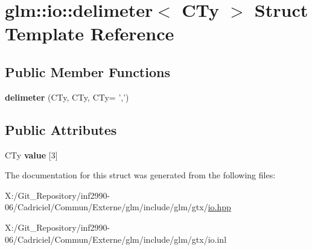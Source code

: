 \hypertarget{structglm_1_1io_1_1delimeter}{\section{glm\-:\-:io\-:\-:delimeter$<$ C\-Ty $>$ Struct Template Reference}
\label{structglm_1_1io_1_1delimeter}
}
\subsection*{Public Member Functions}
\begin{DoxyCompactItemize}
\item 
\hypertarget{structglm_1_1io_1_1delimeter_acd4b6e1e816d423a069688c4772b9500}{{\bfseries delimeter} (C\-Ty, C\-Ty, C\-Ty= ',')}\label{structglm_1_1io_1_1delimeter_acd4b6e1e816d423a069688c4772b9500}

\end{DoxyCompactItemize}
\subsection*{Public Attributes}
\begin{DoxyCompactItemize}
\item 
\hypertarget{structglm_1_1io_1_1delimeter_a9ade129dae50c4f716f724e7425f9c68}{C\-Ty {\bfseries value} \mbox{[}3\mbox{]}}\label{structglm_1_1io_1_1delimeter_a9ade129dae50c4f716f724e7425f9c68}

\end{DoxyCompactItemize}


The documentation for this struct was generated from the following files\-:\begin{DoxyCompactItemize}
\item 
X\-:/\-Git\-\_\-\-Repository/inf2990-\/06/\-Cadriciel/\-Commun/\-Externe/glm/include/glm/gtx/\hyperlink{io_8hpp}{io.\-hpp}\item 
X\-:/\-Git\-\_\-\-Repository/inf2990-\/06/\-Cadriciel/\-Commun/\-Externe/glm/include/glm/gtx/io.\-inl\end{DoxyCompactItemize}
